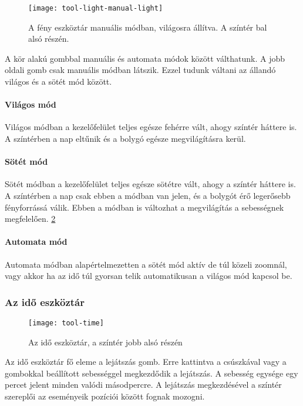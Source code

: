 \begin{figure}[h!]
	\centering
	\texttt{[image: tool-light-manual-light]}
	\caption{A fény eszköztár manuális módban, világosra állítva. A színtér bal alsó részén.}
	\label{fig:tool-light-manual-light}
\end{figure}

A kör alakú gombbal manuális és automata módok között válthatunk. A jobb oldali gomb csak manuális módban látszik. Ezzel tudunk váltani az állandó világos és a sötét mód között.

\paragraph{Világos mód}

Világos módban a kezelőfelület teljes egésze fehérre vált, ahogy színtér háttere is. A színtérben a nap eltűnik és a bolygó egésze megvilágításra kerül.

\paragraph{Sötét mód}

Sötét módban a kezelőfelület teljes egésze sötétre vált, ahogy a színtér háttere is. A színtérben a nap csak ebben a módban van jelen, és a bolygót érő legerősebb fényforrássá válik. Ebben a módban is változhat a megvilágítás a sebességnek megfelelően. \ref{fig:tool-time}

\paragraph{Automata mód}

Automata módban alapértelmezetten a sötét mód aktív de túl közeli zoomnál, vagy akkor ha az idő túl gyorsan telik automatikusan a világos mód kapcsol be.

\subsubsection{Az idő eszköztár}

\begin{figure}[h!]
	\centering
	\texttt{[image: tool-time]}
	\caption{Az idő eszköztár, a színtér jobb alsó részén}
	\label{fig:tool-time}
\end{figure}

Az idő eszköztár fő eleme a lejátszás gomb. Erre kattintva a csúszkával vagy a gombokkal beállított sebességgel megkezdődik a lejátszás. A sebesség egysége egy percet jelent minden valódi másodpercre. A lejátszás megkezdésével a színtér szereplői az eseményeik pozíciói között fognak mozogni.

